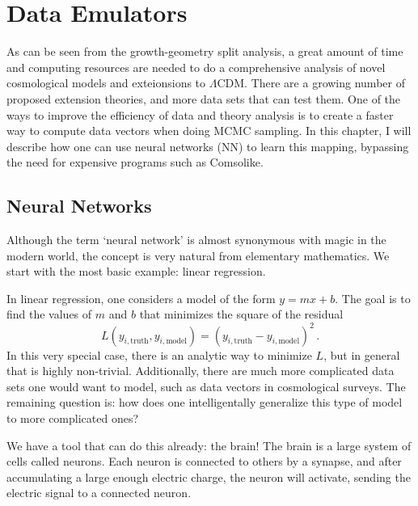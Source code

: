 \chapter{Data Emulators}
As can be seen from the growth-geometry split analysis, a great amount of time and computing resources are needed to do a comprehensive analysis of novel cosmological models and exteionsions to $\Lambda$CDM. There are a growing number of proposed extension theories, and more data sets that can test them. One of the ways to improve the efficiency of data and theory analysis is to create a faster way to compute data vectors when doing MCMC sampling. In this chapter, I will describe how one can use neural networks (NN) to learn this mapping, bypassing the need for expensive programs such as Comsolike.
\section{Neural Networks}
Although the term `neural network' is almost synonymous with magic in the modern world, the concept is very natural from elementary mathematics. We start with the most basic example: linear regression. 

In linear regression, one considers a model of the form $y=mx+b$. The goal is to find the values of $m$ and $b$ that minimizes the square of the residual
\begin{equation}
	L(y_{i,\mathrm{truth}},y_{i,\mathrm{model}}) = (y_{i,\mathrm{truth}} - y_{i,\mathrm{model}})^2\,.
\end{equation}
In this very special case, there is an analytic way to minimize $L$, but in general that is highly non-trivial. Additionally, there are much more complicated data sets one would want to model, such as data vectors in cosmological surveys. The remaining question is: how does one intelligentally generalize this type of model to more complicated ones?

We have a tool that can do this already: the brain! The brain is a large system of cells called neurons. Each neuron is connected to others by a synapse, and after accumulating a large enough electric charge, the neuron will activate, sending the electric signal to a connected neuron. 

